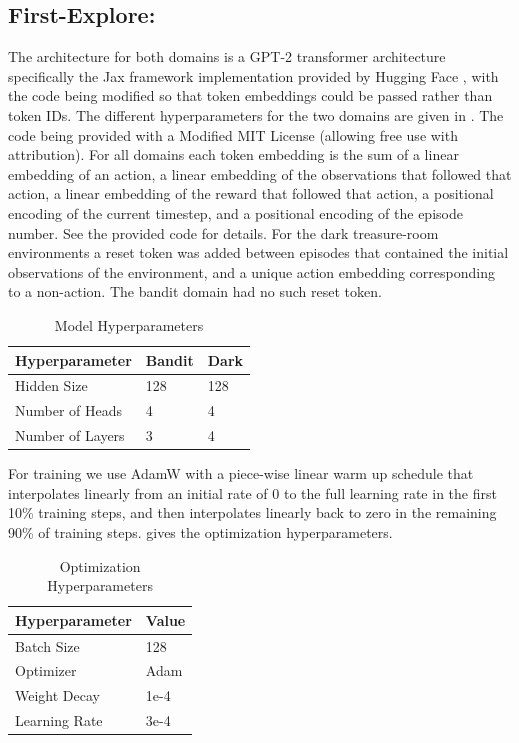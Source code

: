 \documentclass{article}
\begin{document}
\subsection{First-Explore:}
The architecture for both domains is a GPT-2 transformer architecture \citep{radford2019language} specifically the Jax framework \citep{jax2018github} implementation provided by Hugging Face \citep{wolf2020huggingfaces}, with the code being modified so that token embeddings could be passed rather than token IDs. The different hyperparameters for the two domains are given in . The code being provided with a Modified MIT License (allowing free use with attribution).
For all domains each token embedding is the sum of a linear embedding of an action, a linear embedding of the observations that followed that action, a linear embedding of the reward that followed that action, a positional encoding of the current timestep, and a positional encoding of the episode number. See the provided code for details. For the dark treasure-room environments a reset token was added between episodes that contained the initial observations of the environment, and a unique action embedding corresponding to a non-action. The bandit domain had no such reset token.
\begin{table}[h]
\caption{Model Hyperparameters}
\label{modelhyper}
\centering
\begin{tabular}{lll}
\toprule
Hyperparameter   & Bandit & Dark \\ \midrule
Hidden Size      & 128   &  128\\
Number of Heads  & 4     &  4 \\
Number of Layers & 3      & 4 \\ \bottomrule
\end{tabular}
\end{table}
For training we use AdamW \citep{loshchilov2019decoupled} with a piece-wise linear warm up schedule that interpolates linearly from an initial rate of \(0\) to the full learning rate in the first 10\% training steps, and then interpolates linearly back to zero in the remaining 90\% of training steps.  gives the optimization hyperparameters.
\begin{table}[h]
\caption{Optimization Hyperparameters}
\label{trainhyper}
\centering
\begin{tabular}{ll}
\toprule
Hyperparameter   & Value \\ \midrule
Batch Size      & 128\\
Optimizer  & Adam\\
Weight Decay  &  1e-4\\
Learning Rate & 3e-4 \\ \bottomrule
\end{tabular}
\end{table}
\end{document}
